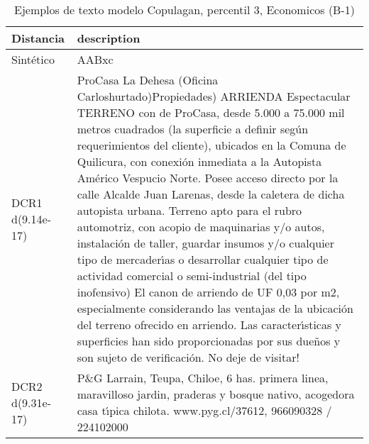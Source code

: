 \begin{table}[H]
\centering
\fontsize{10}{14}\selectfont
\caption{Ejemplos de texto modelo Copulagan, percentil 3, Economicos (B-1)}
\label{table-example-economicos-b-1-copulagan-3p-text}
\begin{tabular}{|l|m{35em}|}
\hline
\rowcolor[gray]{0.8}
Distancia & description \\
\hline Sintético & AABxc \\
\hline DCR1 d(9.14e-17) & ProCasa La Dehesa (Oficina Carloshurtado)Propiedades) ARRIENDA Espectacular TERRENO con   de ProCasa, desde 5.000 a 75.000 mil metros cuadrados (la superficie a definir seg\'un requerimientos del cliente), ubicados en la Comuna de Quilicura, con conexi\'on inmediata a la Autopista Am\'erico Vespucio Norte. Posee acceso directo por la calle Alcalde Juan Larenas, desde la caletera de dicha autopista urbana.    Terreno apto para el rubro automotriz, con acopio de maquinarias y/o autos, instalaci\'on de taller, guardar insumos y/o cualquier tipo de mercader{\'\i}as o desarrollar cualquier tipo de actividad comercial o semi-industrial (del tipo inofensivo)    El canon de arriendo de UF 0,03 por m2, especialmente considerando las ventajas de la ubicaci\'on del terreno ofrecido en arriendo. Las caracter{\'\i}sticas y superficies han sido proporcionadas por sus due\~nos y son sujeto de verificaci\'on. No deje de visitar! \\
\hline DCR2 d(9.31e-17) & P\&G Larrain, Teupa, Chiloe, 6 has. primera linea, maravilloso jardin, praderas y bosque nativo, acogedora casa t{\'\i}pica chilota. www.pyg.cl/37612, 966090328 / 224102000 \\
\hline
\end{tabular}
\end{table}
